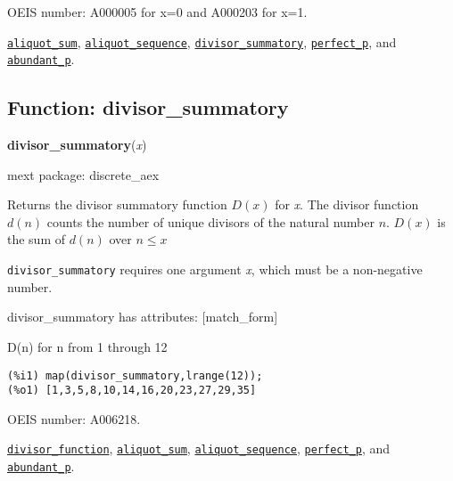 \documentclass[]{article}
\begin{document}
OEIS number: A000005 for x=0 and A000203 for x=1.


  \hyperlink{aliquot_sum}{{\tt aliquot\_sum}}, \hyperlink{aliquot_sequence}{{\tt aliquot\_sequence}}, \hyperlink{divisor_summatory}{{\tt divisor\_summatory}}, \hyperlink{perfect_p}{{\tt perfect\_p}}, and \hyperlink{abundant_p}{{\tt abundant\_p}}.

\vspace{5 pt}


\subsection{Function: divisor\_summatory\label{sec:divisor_summatory}}
\hypertarget{divisor_summatory}{}
{\bf divisor\_summatory}({\it x})


\noindent mext package: discrete\_aex



\vspace{5 pt}
Returns the divisor summatory function $D(x)$ for {\it x}. The divisor function $d(n)$ counts the number of unique divisors of the natural number $n$. $D(x)$ is the sum of $d(n)$ over $n \le x$ 

\vspace{5 pt}

   {\tt divisor\_summatory} requires one argument {\it x}, which must be a non-negative number.


\vspace{5 pt}

divisor\_summatory has attributes: [match\_form]

\vspace{5 pt}


   D(n) for n from 1 through 12 

\begin{Verbatim}[frame=single]
(%i1) map(divisor_summatory,lrange(12));
(%o1) [1,3,5,8,10,14,16,20,23,27,29,35]
\end{Verbatim}


OEIS number: A006218.


  \hyperlink{divisor_function}{{\tt divisor\_function}}, \hyperlink{aliquot_sum}{{\tt aliquot\_sum}}, \hyperlink{aliquot_sequence}{{\tt aliquot\_sequence}}, \hyperlink{perfect_p}{{\tt perfect\_p}}, and \hyperlink{abundant_p}{{\tt abundant\_p}}.
\end{document}
